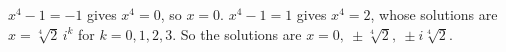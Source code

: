 $x^4-1=-1$ gives $x^4=0$, so $x=0$. $x^4-1=1$ gives $x^4=2$, whose solutions are $x=\sqrt[4]2\,i^k$ for $k=0,1,2,3$. So the solutions are $\boxed{x=0,\ \pm\sqrt[4]2,\ \pm i\sqrt[4]2}$.
